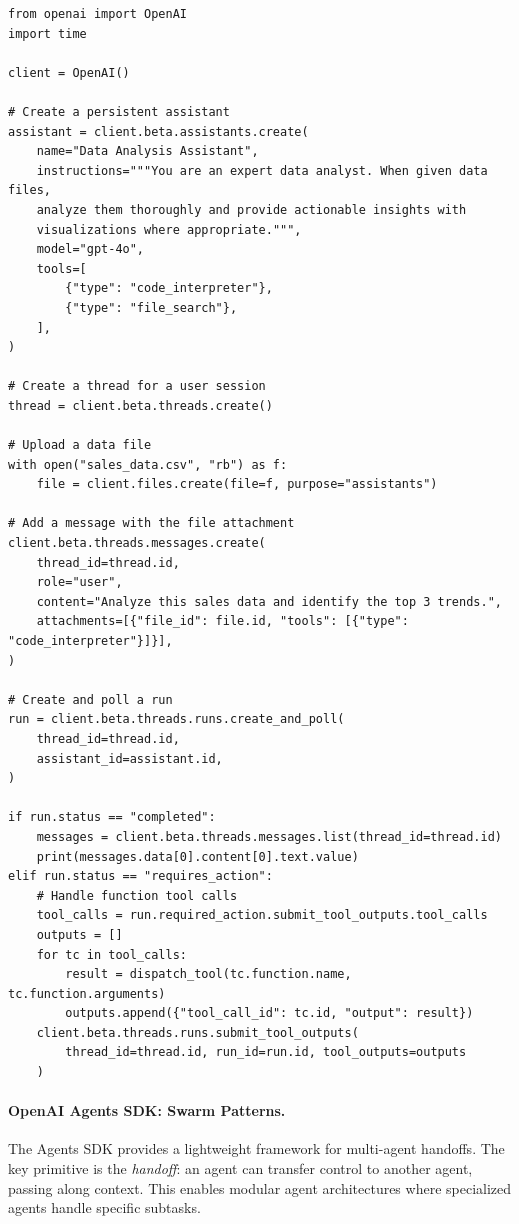 \begin{lstlisting}[style=pythonstyle, caption={OpenAI Assistants API with tool use}]
from openai import OpenAI
import time

client = OpenAI()

# Create a persistent assistant
assistant = client.beta.assistants.create(
    name="Data Analysis Assistant",
    instructions="""You are an expert data analyst. When given data files,
    analyze them thoroughly and provide actionable insights with
    visualizations where appropriate.""",
    model="gpt-4o",
    tools=[
        {"type": "code_interpreter"},
        {"type": "file_search"},
    ],
)

# Create a thread for a user session
thread = client.beta.threads.create()

# Upload a data file
with open("sales_data.csv", "rb") as f:
    file = client.files.create(file=f, purpose="assistants")

# Add a message with the file attachment
client.beta.threads.messages.create(
    thread_id=thread.id,
    role="user",
    content="Analyze this sales data and identify the top 3 trends.",
    attachments=[{"file_id": file.id, "tools": [{"type": "code_interpreter"}]}],
)

# Create and poll a run
run = client.beta.threads.runs.create_and_poll(
    thread_id=thread.id,
    assistant_id=assistant.id,
)

if run.status == "completed":
    messages = client.beta.threads.messages.list(thread_id=thread.id)
    print(messages.data[0].content[0].text.value)
elif run.status == "requires_action":
    # Handle function tool calls
    tool_calls = run.required_action.submit_tool_outputs.tool_calls
    outputs = []
    for tc in tool_calls:
        result = dispatch_tool(tc.function.name, tc.function.arguments)
        outputs.append({"tool_call_id": tc.id, "output": result})
    client.beta.threads.runs.submit_tool_outputs(
        thread_id=thread.id, run_id=run.id, tool_outputs=outputs
    )
\end{lstlisting}

\paragraph{OpenAI Agents SDK: Swarm Patterns.}
\label{openai-agents-sdk-swarm-patterns.}

The Agents SDK provides a lightweight framework for multi-agent handoffs. The key primitive is the \emph{handoff}: an agent can transfer control to another agent, passing along context. This enables modular agent architectures where specialized agents handle specific subtasks.

